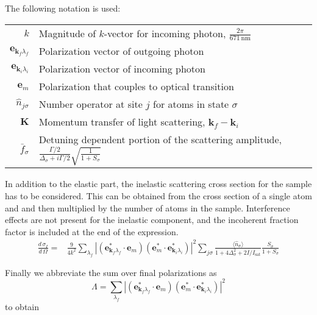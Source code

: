 \documentclass[11pt,letter]{article}
\newcommand{\bv}[1]{\ensuremath{\bm{#1}}}
\newcommand{\dsig}[1]{\ensuremath{ \frac{ d\,\sigma_{#1} }{d\,\Omega} }}
\begin{document}
The following notation is used: 

\begin{center}
  \begin{tabular}{ r  l  }
    $k$ & Magnitude of $k$-vector for incoming photon,  $\frac{2\pi}{671\,\mathrm{nm}}$   \\ 
    $\bv{e}_{\bv{k}_{f} \lambda_{f}}$  & Polarization vector of outgoing photon  \\ 
    $\bv{e}_{\bv{k}_{i} \lambda_{i}}$  & Polarization vector of incoming photon  \\ 
    $\bv{e}_{m}$  & Polarization that couples to optical transition  \\ 
    $\hat{n}_{j\sigma}$ & Number operator at site $j$ for atoms in state $\sigma$   \\ 
    $\bv{K}$ &  Momentum transfer of light scattering, $\bv{k}_{f} - \bv{k}_{i}$  \\ 
    $\bar{f}_{\sigma}$ & Detuning dependent portion of the scattering amplitude, $\frac{\Gamma/2}{\Delta_{\sigma} + i \Gamma/2 }\sqrt{\frac{1}{1+S_{\sigma} }}$ \\ 
  \end{tabular}
\end{center}

In addition to the elastic part, the inelastic scattering cross section for the
sample has to be considered.   This can be obtained from the cross section of a
single atom and and then multiplied by the number of atoms in the sample.
Interference effects are not present for the inelastic component, and the incoherent fraction factor is included at the end of the expression.  
\begin{equation}
\begin{split}
\dsig{I} =&  \frac{9}{4k^{2}} 
              \sum_{\lambda_{f}}  | (\bv{e}_{\bv{k}_{f} \lambda_{f}}^{*} \cdot \bv{e}_{m} ) 
                                   (\bv{e}_{m}^{*} \cdot \bv{e}_{\bv{k}_{i} \lambda_{i}}^{*}  ) 
                                 |^{2} 
              \sum_{j\sigma}
              \frac{\langle \hat{n}_{\sigma} \rangle}
              {1+ 4\Delta_{\sigma}^{2} + 2 I / I_{\mathrm{sat}} }
              \frac{S_{\sigma}}{  1+S_{\sigma} } 
\end{split}
\end{equation}

Finally we abbreviate the sum over final polarizations as 
\begin{equation} 
 \Lambda =       \sum_{\lambda_{f}}  | (\bv{e}_{\bv{k}_{f} \lambda_{f}}^{*} \cdot \bv{e}_{m} ) 
                                   (\bv{e}_{m}^{*} \cdot \bv{e}_{\bv{k}_{i} \lambda_{i}}^{*}  ) 
                                 |^{2}
\end{equation}
to obtain 
\end{document}
